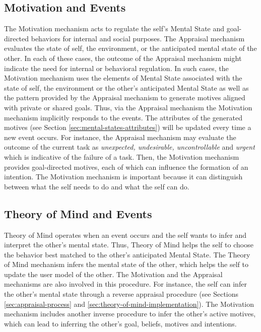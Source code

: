 \documentclass[12pt]{report}
\begin{document}
\subsection{Motivation and Events}
The Motivation mechanism acts to regulate the self's Mental State and
goal-directed behaviors for internal and social purposes. The Appraisal mechanism
evaluates the state of self, the environment, or the anticipated mental state of
the other. In each of these cases, the outcome of the Appraisal mechanism might
indicate the need for internal or behavioral regulation. In such cases, the
Motivation mechanism uses the elements of Mental State associated with the state
of self, the environment or the other's anticipated Mental State as well as the
pattern provided by the Appraisal mechanism to generate motives aligned with
private or shared goals. Thus, via the Appraisal mechanism the Motivation
mechanism implicitly responds to the events. The attributes of the generated
motives (see Section \ref{sec:mental-states-attributes}) will be updated every
time a new event occurs. For instance, the Appraisal mechanism may evaluate the
outcome of the current task as \textit{unexpected, undesirable, uncontrollable}
and \textit{urgent} which is indicative of the failure of a task. Then, the
Motivation mechanism provides goal-directed motives, each of which can
influence the formation of an intention. {\color{red}The Motivation mechanism
is important because it can distinguish between what the self needs to do and
what the self can do.}

\subsection{Theory of Mind and Events}
Theory of Mind operates when an event occurs and the self wants to infer and
interpret the other's mental state. Thus, Theory of Mind helps the self to
choose the behavior best matched to the other's anticipated Mental State.
The Theory of Mind mechanism infers the mental state of the other, which helps
the self to update the user model of the other. The Motivation and the Appraisal
mechanisms are also involved in this procedure. For instance, the self can infer
the other's mental state through a reverse appraisal procedure (see Sections
\ref{sec:appraisal-process} and \ref{sec:theory-of-mind-implementation}). The
Motivation mechanism includes another inverse procedure to infer the other's
active motives, which can lead to inferring the other's goal, beliefs, motives
and intentions.
\end{document}
